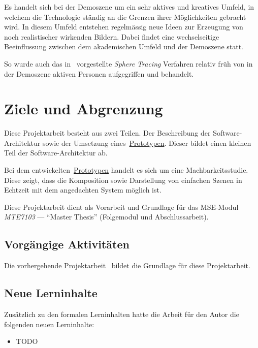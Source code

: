Es handelt sich bei der Demoszene um ein sehr aktives und kreatives
Umfeld, in welchem die Technologie ständig an die Grenzen ihrer
Möglichkeiten gebracht wird. In diesem Umfeld entstehen regelmässig neue
Ideen zur Erzeugung von noch realistischer wirkenden Bildern. Dabei
findet eine wechselseitige Beeinflussung zwischen dem akademischen
Umfeld und der Demoszene statt.

So wurde auch das in~\cite{osterwalder_sven_volume_2016} vorgestellte
\textit{Sphere Tracing} Verfahren
relativ früh von in der Demoszene aktiven Personen aufgegriffen und
behandelt.

\section{Ziele und Abgrenzung}
\label{sec:objectives}

Diese Projektarbeit besteht aus zwei Teilen. Der Beschreibung der  Software-Architektur sowie der Umsetzung
eines~\hyperref[chap:prototype]{Prototypen}. Dieser bildet einen kleinen Teil
der Software-Architektur ab.

Bei dem entwickelten~\hyperref[chap:prototype]{Prototypen} handelt es sich um
eine Machbarkeitsstudie. Diese zeigt, dass die Komposition sowie Darstellung
von einfachen Szenen in Echtzeit mit dem angedachten System möglich ist.

Diese Projektarbeit dient als Vorarbeit und Grundlage für das MSE-Modul
\textit{MTE7103} --- ``Master Thesis'' (Folgemodul und Abschlussarbeit).

\subsection{Vorgängige Aktivitäten}
\label{subsec:preliminaries}

Die vorhergehende Projektarbeit~\cite{osterwalder_sven_volume_2016} bildet die
Grundlage für diese Projektarbeit.

\subsection{Neue Lerninhalte}
\label{subsec:new_learning_contents}

Zusätzlich zu den formalen Lerninhalten hatte die Arbeit für den Autor
die folgenden  neuen Lerninhalte:
\begin{itemize}
    \item{TODO}
\end{itemize}

